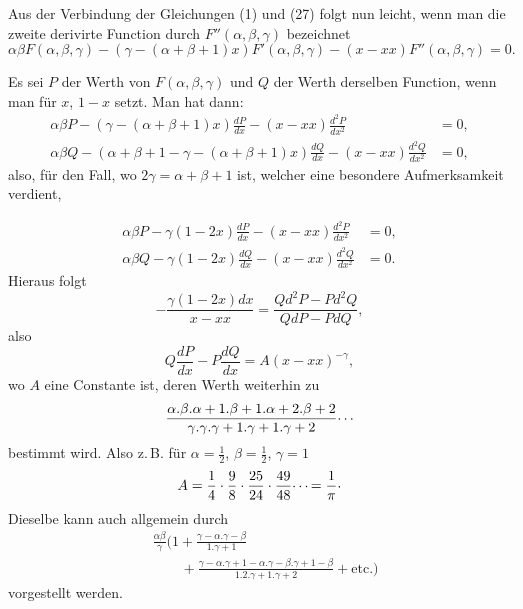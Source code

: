 \begingroup
\makeatletter\tagsleft@true\let\veqno\@@leqno\makeatother
{}
\par\indent Aus der Verbindung der Gleichungen (1) und (27) folgt nun leicht, wenn man die zweite derivirte Function durch $F''(\alpha,\beta,\gamma)$ bezeichnet
\begin{equation}
\alpha\beta F(\alpha,\beta,\gamma)-(\gamma-(\alpha+\beta+1)x)F'(\alpha,\beta,\gamma)-(x-xx)F''(\alpha,\beta,\gamma)=0.\tag*{(30)}
\end{equation}
\par\indent Es sei $P$ der Werth von $F(\alpha,\beta,\gamma)$ und $Q$ der Werth derselben Function, wenn man für $x$, $1-x$ setzt. Man hat dann:
\[\begin{aligned}
\alpha\beta P-(\gamma-(\alpha+\beta+1)x)\frac{dP}{dx}-(x-xx)\frac{d^2P}{dx^2}&=0,\\[.7em]
\alpha\beta Q-(\alpha+\beta+1-\gamma-(\alpha+\beta+1)x)\frac{dQ}{dx}-(x-xx)\frac{d^2Q}{dx^2}&=0,
\end{aligned}\]
\noindent also, für den Fall, wo $2\gamma=\alpha+\beta+1$ ist, welcher eine besondere Aufmerksamkeit verdient,
\par\smallskip\noindent{\small[S. 40]}\par
\[\begin{aligned}
\alpha\beta P-\gamma(1-2x)\frac{dP}{dx}-(x-xx)\frac{d^2P}{dx^2}&=0,\\[.7em]
\alpha\beta Q-\gamma(1-2x)\frac{dQ}{dx}-(x-xx)\frac{d^2Q}{dx^2}&=0.
\end{aligned}\]
\noindent Hieraus folgt
\clearpage{}
\[-\frac{\gamma(1-2x)dx}{x-xx}=\frac{Qd^2P-Pd^2Q}{QdP-PdQ},\]
\noindent also
\begin{equation}
Q\frac{dP}{dx}-P\frac{dQ}{dx}=A(x-xx)^{-\gamma},\tag*{(31)}
\end{equation}
\noindent wo $A$ eine Constante ist, deren Werth weiterhin zu
\[\frac{\alpha{.}\beta{.}\alpha+1{.}\beta+1{.}\alpha+2{.}\beta+2}{\gamma{.}\gamma{.}\gamma+1{.}\gamma+1{.}\gamma+2}\mathpunct{\raisebox{.4ex}{.\,.\,.}}\]
\noindent bestimmt wird. Also z.\,B. für $\alpha=\frac12$, $\beta=\frac12$, $\gamma=1$
\[A=\frac14\cdot\frac98\cdot\frac{25}{24}\cdot\frac{49}{48}\mathpunct{\raisebox{.4ex}{.\,.\,.}}=\frac1\pi\mathpunct{\raisebox{.35ex}{.}}\]
\noindent Dieselbe kann auch allgemein durch
\[\begin{aligned}
&\frac{\alpha\beta}{\gamma}\Biggl(1+\frac{\gamma-\alpha{.}\gamma-\beta}{1{.}\gamma+1}\\[.7em]
&\qquad+\frac{\gamma-\alpha{.}\gamma+1-\alpha{.}\gamma-\beta{.}\gamma+1-\beta}{1{.}2{.}\gamma+1{.}\gamma+2}+\text{etc.}\Biggr)
\end{aligned}\]
\noindent vorgestellt werden.
\clearpage
\endgroup

